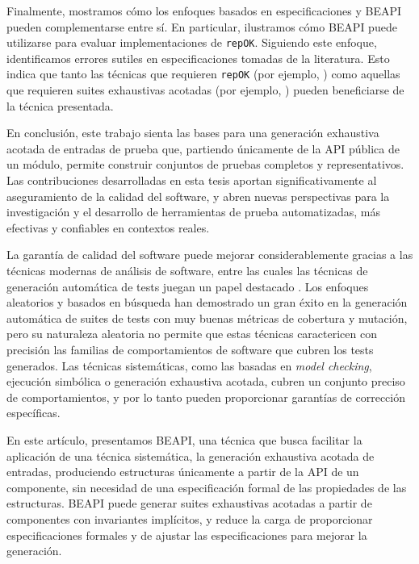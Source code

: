 Finalmente, mostramos cómo los enfoques basados en especificaciones y BEAPI pueden complementarse entre sí. 
En particular, ilustramos cómo BEAPI puede utilizarse para evaluar implementaciones de \texttt{repOK}. 
Siguiendo este enfoque, identificamos errores sutiles en especificaciones tomadas de la literatura. 
Esto indica que tanto las técnicas que requieren \texttt{repOK} (por ejemplo, \cite{Rosner15}) como aquellas que requieren suites exhaustivas acotadas (por ejemplo, \cite{Molina+2021}) 
pueden beneficiarse de la técnica presentada.

En conclusión, este trabajo sienta las bases para una generación exhaustiva acotada de entradas de prueba que, 
partiendo únicamente de la API pública de un módulo, permite construir conjuntos de pruebas completos y representativos. 
Las contribuciones desarrolladas en esta tesis aportan significativamente al aseguramiento de la calidad del software, 
y abren nuevas perspectivas para la investigación y el desarrollo de herramientas de prueba automatizadas, 
más efectivas y confiables en contextos reales.


La garantía de calidad del software puede mejorar considerablemente gracias a las técnicas modernas de análisis de software, 
entre las cuales las técnicas de generación automática de tests juegan un papel destacado \cite{Cadar08, Luckow14, Fraser11, Pacheco07, Ma15, goGodefroid05, Marinov01, Boyapati02,Godefroid12}. 
Los enfoques aleatorios y basados en búsqueda han demostrado un gran éxito en la generación automática de suites de tests con muy buenas métricas de cobertura y mutación, 
pero su naturaleza aleatoria no permite que estas técnicas caractericen con precisión las familias de comportamientos de software 
que cubren los tests generados. Las técnicas sistemáticas, como las basadas en \emph{model checking}, ejecución simbólica 
o generación exhaustiva acotada, cubren un conjunto preciso de comportamientos, y por lo tanto pueden proporcionar garantías 
de corrección específicas.

En este artículo, presentamos BEAPI, una técnica que busca facilitar la aplicación de una técnica sistemática, 
la generación exhaustiva acotada de entradas, produciendo estructuras únicamente a partir de la API de un componente, 
sin necesidad de una especificación formal de las propiedades de las estructuras. BEAPI puede generar suites exhaustivas acotadas 
a partir de componentes con invariantes implícitos, y reduce la carga de proporcionar especificaciones formales y de ajustar 
las especificaciones para mejorar la generación. 

